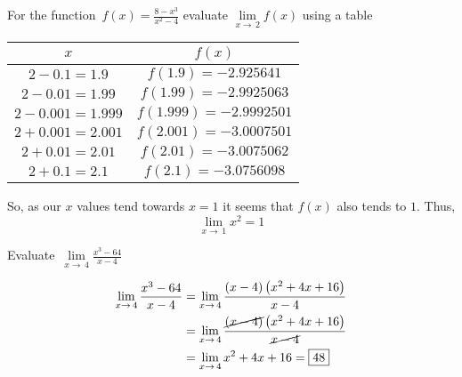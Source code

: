 \documentclass[addpoints]{exam}
\begin{document}
\vspace{1in}

\noindent{}

\vspace{.1in}

\begin{center}
\end{center}

\begin{questions}
  \question For the function $\displaystyle\, f(x)=\frac{8-x^3}{x^2-4}$ evaluate $\lim\limits_{x\to\,2} f(x)$ using a table
  \begin{solution}[\stretch{1}]
    \begin{center}
      \begin{tabular}{|c|c|}
          \hline
          $x$ & $f(x)$ \\
          \hline
          $2-0.1 = 1.9$ & $f(1.9) = -2.925641$ \\
          \hline
          $2-0.01 = 1.99$ & $f(1.99) = -2.9925063$ \\
          \hline
          $2-0.001 = 1.999$ & $f(1.999) = -2.9992501$ \\
          \hline
          $2 + 0.001 = 2.001$ & $f(2.001) = -3.0007501$ \\
          \hline
          $2 + 0.01 = 2.01$ & $f(2.01) = -3.0075062$ \\
          \hline
          $2 + 0.1 = 2.1$ & $f(2.1) = -3.0756098$ \\
          \hline
      \end{tabular}
    \end{center}
    So, as our $x$ values tend towards $x=1$ it seems that $f(x)$ also tends to $1$. Thus, 
    \[\boxed{\lim\limits_{x\to\,1} x^2 = 1}\]
  \end{solution}

  \question Evaluate $\displaystyle\, \lim\limits_{x\to\,4}\frac{x^3-64}{x-4}$
  \begin{solution}[\stretch{1}]
    \begin{align*}
      \lim\limits_{x\to\,4} \frac{x^3-64}{x-4} &= \lim\limits_{x\to\,4} \frac{\left(x-4\right)\left(x^2+4x+16\right)}{x-4} \\ 
      &= \lim\limits_{x\to\,4} \frac{\cancel{\left(x-4\right)}\left(x^2+4x+16\right)}{\cancel{x-4}} \\ 
      &= \lim\limits_{x\to\,4} x^2+4x+16 = \boxed{48}
    \end{align*}
  \end{solution}


\end{questions}
\end{document}
